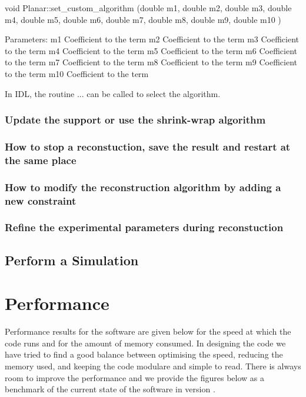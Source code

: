 \documentclass[]{cxs-software}
\begin{document}
\begin{myverbatim}
void Planar::set_custom_algorithm (double m1,
double 	m2,
double 	m3,
double 	m4,
double 	m5,
double 	m6,
double 	m7,
double 	m8,
double 	m9,
double 	m10	 
)
\end{myverbatim}
			
Parameters:
m1 	Coefficient to the  term
m2 	Coefficient to the  term
m3 	Coefficient to the  term
m4 	Coefficient to the  term
m5 	Coefficient to the  term
m6 	Coefficient to the  term
m7 	Coefficient to the  term
m8 	Coefficient to the  term
m9 	Coefficient to the  term
m10 	Coefficient to the  term




In IDL, the routine ... can be called to select the algorithm.


\subsubsection{Update the support or use the shrink-wrap algorithm}

\subsubsection{How to stop a reconstuction, save the result and restart at the same place}

\subsubsection{How to modify the reconstruction algorithm by adding a new constraint}

\subsubsection{Refine the experimental parameters during reconstuction}


\subsection{Perform a Simulation}


\section{Performance}

Performance results for the software are given below for the speed at
which the code runs and for the amount of memory consumed. In
designing the code we have tried to find a good balance between
optimising the speed, reducing the memory used, and keeping the code
modulare and simple to read. There is always room to improve the
performance and we provide the figures below as a benchmark of the
current state of the software in version \ver.
\end{document}
